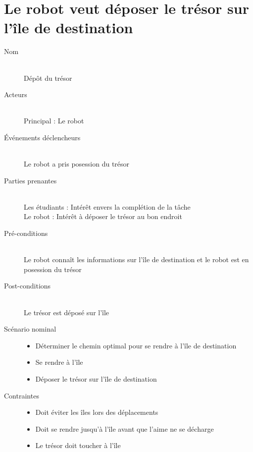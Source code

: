 \section{Le robot veut déposer le trésor sur l'île de destination}
\begin{description}
\item[Nom] \hfill \\
  Dépôt du trésor
\item[Acteurs] \hfill \\
  Principal : Le robot
\item[Événements déclencheurs] \hfill \\
  Le robot a pris posession du trésor
\item[Parties prenantes] \hfill \\
  Les étudiants : Intérêt envers la complétion de la tâche \\
  Le robot : Intérêt à déposer le trésor au bon endroit
\item[Pré-conditions] \hfill \\
  Le robot connaît les informations sur l'île de destination et le robot est en posession du trésor
\item[Post-conditions] \hfill \\
  Le trésor est déposé sur l'île
\item[Scénario nominal] \hfill
  \begin{itemize}
  \item Déterminer le chemin optimal pour se rendre à l'île de destination
  \item Se rendre à l'île
  \item Déposer le trésor sur l'île de destination
  \end{itemize}
\item[Contraintes] \hfill
  \begin{itemize}
  \item Doit éviter les îles lors des déplacements
  \item Doit se rendre jusqu'à l'île avant que l'aime ne se décharge
  \item Le trésor doit toucher à l'île
  \end{itemize}
\end{description}
